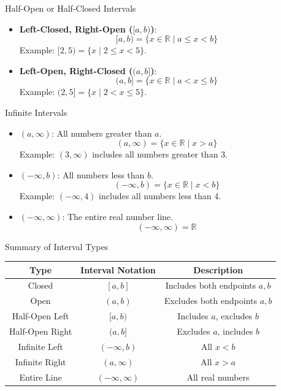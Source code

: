 \documentclass{beamer}
\begin{document}
\begin{frame}{Half-Open or Half-Closed Intervals}
  \begin{itemize}
      \item \textbf{Left-Closed, Right-Open (\([a, b)\))}:
      \[
      [a, b) = \{x \in \mathbb{R} \mid a \leq x < b\}
      \]
      Example: \([2, 5) = \{x \mid 2 \leq x < 5\}\).
      \vspace{5pt}

      \item \textbf{Left-Open, Right-Closed (\((a, b]\))}:
      \[
      (a, b] = \{x \in \mathbb{R} \mid a < x \leq b\}
      \]
      Example: \((2, 5] = \{x \mid 2 < x \leq 5\}\).
  \end{itemize}
\end{frame}

\begin{frame}{Infinite Intervals}
  \begin{itemize}
      \item \((a, \infty)\): All numbers greater than \(a\).
      \[
      (a, \infty) = \{x \in \mathbb{R} \mid x > a\}
      \]
      Example: \((3, \infty)\) includes all numbers greater than 3.

      \item \((-\infty, b)\): All numbers less than \(b\).
      \[
      (-\infty, b) = \{x \in \mathbb{R} \mid x < b\}
      \]
      Example: \((-\infty, 4)\) includes all numbers less than 4.

      \item \((-\infty, \infty)\): The entire real number line.
      \[
      (-\infty, \infty) = \mathbb{R}
      \]
  \end{itemize}
\end{frame}

\begin{frame}{Summary of Interval Types}
  \begin{tabular}{|c|c|c|}
      \hline
      \textbf{Type} & \textbf{Interval Notation} & \textbf{Description} \\
      \hline
      Closed         & \([a, b]\)      & Includes both endpoints \(a, b\) \\
      Open           & \((a, b)\)      & Excludes both endpoints \(a, b\) \\
      Half-Open Left & \([a, b)\)      & Includes \(a\), excludes \(b\) \\
      Half-Open Right & \((a, b]\)     & Excludes \(a\), includes \(b\) \\
      Infinite Left  & \((-\infty, b)\)& All \(x < b\) \\
      Infinite Right & \((a, \infty)\) & All \(x > a\) \\
      Entire Line    & \((-\infty, \infty)\) & All real numbers \\
      \hline
  \end{tabular}
\end{frame}
\end{document}
